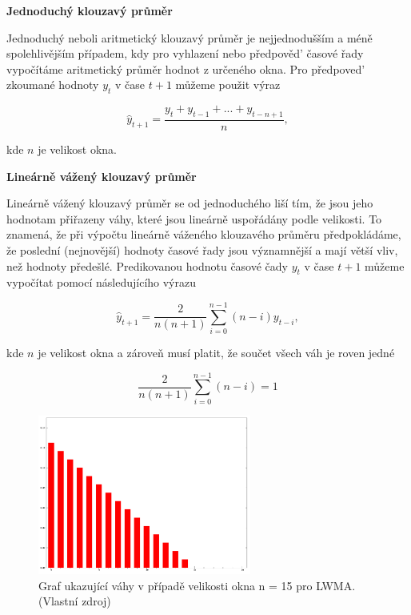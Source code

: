 \documentclass[a4paper,12pt,twoside]{scrreprt}
\begin{document}
\normalsize \textbf{Jednoduchý klouzavý průměr}

Jednoduchý neboli aritmetický klouzavý průměr je nejjednodušším a méně spolehlivějším případem, kdy pro vyhlazení nebo předpověd' časové řady vypočítáme aritmetický průměr hodnot z určeného okna. Pro předpoved' zkoumané hodnoty $y_t$ v čase $t+1$ můžeme použit výraz

\begin{equation}
\hat{y}_{t+1} = \frac{y_t + y_{t-1} + ... + y_{t-n+1}}{n},
\end{equation}

kde $n$ je velikost okna. 

\normalsize \textbf{Lineárně vážený klouzavý průměr}

Lineárně vážený klouzavý průměr se od jednoduchého liší tím, že jsou jeho hodnotam přiřazeny váhy, které jsou lineárně uspořádány podle velikosti. To znamená, že při výpočtu lineárně váženého klouzavého průměru předpokládáme, že poslední (nejnovější) hodnoty časové řady jsou významnější  a mají větší vliv, než hodnoty předešlé. Predikovanou hodnotu časové čady $y_t$ v čase $t+1$ můžeme vypočítat pomocí následujícího výrazu

\begin{equation}
\hat{y}_{t+1} = \frac{2}{n(n+1)}\sum_{i=0}^{n-1}(n-i)y_{t-i},
\end{equation}

kde $n$ je velikost okna a zároveň musí platit, že součet všech váh je roven jedné

\begin{equation}
\frac{2}{n(n+1)}\sum_{i=0}^{n-1}(n-i) = 1
\end{equation}

\begin{figure}[h]
  \centering
  \includegraphics[width=7cm]{pictures/linearMAweights.png}
  \caption{Graf ukazující váhy v případě velikosti okna n = 15 pro LWMA. \newline(Vlastní zdroj)}
  \label{fig:linearWeights}
\end{figure}
\end{document}
